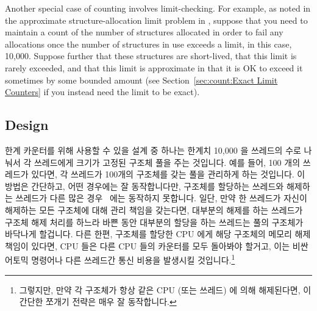 Another special case of counting involves limit-checking.
For example, as noted in the approximate structure-allocation limit
problem in \QuickQuizRef{\QcountQapproxcnt},
suppose that you need to maintain a count of the number of
structures allocated in order to fail any allocations once the number
of structures in use exceeds a limit, in this case, 10,000.
Suppose further that these structures are short-lived, that this
limit is rarely exceeded, and that this limit is approximate in
that it is OK to exceed it sometimes by some bounded amount
(see Section~\ref{sec:count:Exact Limit Counters}
if you instead need the limit to be exact).
\fi

\subsection{Design}

한계 카운터를 위해 사용할 수 있을 설계 중 하나는 한계치 10,000 을 쓰레드의 수로
나눠서 각 쓰레드에게 크기가 고정된 구조체 풀을 주는 것입니다.
예를 들어, 100 개의 쓰레드가 있다면, 각 쓰레드가 100개의 구조체를 갖는 풀을
관리하게 하는 것입니다.
이 방법은 간단하고, 어떤 경우에는 잘 동작합니다만, 구조체를 할당하는 쓰레드와
해제하는 쓰레드가 다른 많은 경우~\cite{McKenney93} 에는 동작하지 못합니다.
일단, 만약 한 쓰레드가 자신이 해제하는 모든 구조체에 대해 관리 책임을 갖는다면,
대부분의 해제를 하는 쓰레드가 구조체 해제 처리를 하느라 바쁜 동안 대부분의
할당을 하는 쓰레드는 풀의 구조체가 바닥나게 할겁니다.
다른 한편, 구조체를 할당한 CPU 에게 해당 구조체의 메모리 해제 책임이 있다면,
CPU 들은 다른 CPU 들의 카운터를 모두 돌아봐야 할거고, 이는 비싼 어토믹 명령어나
다른 쓰레드간 통신 비용을 발생시킬 것입니다.\footnote{
	그렇지만, 만약 각 구조체가 항상 같은 CPU (또는 쓰레드) 에 의해
	해제된다면, 이 간단한 쪼개기 전략은 매우 잘 동작합니다.}

